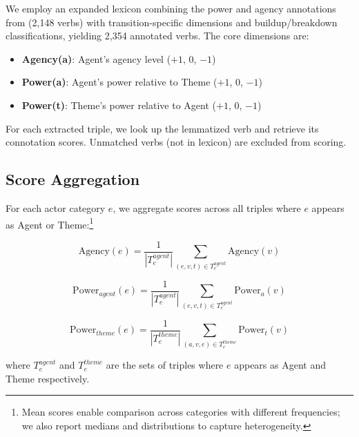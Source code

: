\documentclass[../main.tex]{subfiles}
\begin{document}
We employ an expanded lexicon combining the power and agency annotations from \cite{sap2017connotation} (2,148 verbs) with transition-specific dimensions and buildup/breakdown classifications, yielding 2,354 annotated verbs. The core dimensions are:

\begin{itemize}
    \item \textbf{Agency(a)}: Agent's agency level ($+1$, $0$, $-1$)
    \item \textbf{Power(a)}: Agent's power relative to Theme ($+1$, $0$, $-1$)
    \item \textbf{Power(t)}: Theme's power relative to Agent ($+1$, $0$, $-1$)
\end{itemize}

For each extracted triple, we look up the lemmatized verb and retrieve its connotation scores. Unmatched verbs (not in lexicon) are excluded from scoring.

\subsection{Score Aggregation}

For each actor category $e$, we aggregate scores across all triples where $e$ appears as Agent or Theme:\footnote{Mean scores enable comparison across categories with different frequencies; we also report medians and distributions to capture heterogeneity.}

\begin{equation}
    \text{Agency}(e) = \frac{1}{|T_e^{agent}|} \sum_{(e, v, t) \in T_e^{agent}} \text{Agency}(v)
\end{equation}

\begin{equation}
    \text{Power}_{agent}(e) = \frac{1}{|T_e^{agent}|} \sum_{(e, v, t) \in T_e^{agent}} \text{Power}_a(v)
\end{equation}

\begin{equation}
    \text{Power}_{theme}(e) = \frac{1}{|T_e^{theme}|} \sum_{(a, v, e) \in T_e^{theme}} \text{Power}_t(v)
\end{equation}

where $T_e^{agent}$ and $T_e^{theme}$ are the sets of triples where $e$ appears as Agent and Theme respectively.
\end{document}
